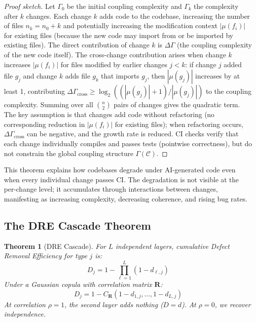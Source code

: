 \documentclass[11pt, a4paper, logo, copyright]{googledeepmind}
\newtheorem{theorem}{Theorem}[section]
\begin{document}
\begin{proof}[Proof sketch]
Let $\Gamma_0$ be the initial coupling complexity and $\Gamma_k$ the complexity after $k$ changes. Each change $k$ adds code to the codebase, increasing the number of files $n_k = n_0 + k$ and potentially increasing the modification context $|\mu(f_i)|$ for existing files (because the new code may import from or be imported by existing files). The direct contribution of change $k$ is $\Delta \Gamma$ (the coupling complexity of the new code itself). The cross-change contribution arises when change $k$ increases $|\mu(f_i)|$ for files modified by earlier changes $j < k$: if change $j$ added file $g_j$ and change $k$ adds file $g_k$ that imports $g_j$, then $|\mu(g_j)|$ increases by at least 1, contributing $\Delta \Gamma_{\text{cross}} \geq \log_2((|\mu(g_j)|+1)/|\mu(g_j)|)$ to the coupling complexity. Summing over all $\binom{n}{2}$ pairs of changes gives the quadratic term. The key assumption is that changes add code without refactoring (no corresponding reduction in $|\mu(f_i)|$ for existing files); when refactoring occurs, $\Delta \Gamma_{\text{cross}}$ can be negative, and the growth rate is reduced. CI checks verify that each change individually compiles and passes tests (pointwise correctness), but do not constrain the global coupling structure $\Gamma(\mathcal{C})$.
\end{proof}

This theorem explains how codebases degrade under AI-generated code even when every individual change passes CI. The degradation is not visible at the per-change level; it accumulates through interactions between changes, manifesting as increasing complexity, decreasing coherence, and rising bug rates.

\subsection{The DRE Cascade Theorem}

\begin{theorem}[DRE Cascade]
\label{thm:dre-cascade}
For $L$ independent layers, cumulative Defect Removal Efficiency for type $j$ is:
\begin{equation}
D_j = 1 - \prod_{\ell=1}^{L} (1 - d_{\ell,j})
\end{equation}
Under a Gaussian copula with correlation matrix $\mathbf{R}$:
\begin{equation}
D_j = 1 - C_{\mathbf{R}}(1 - d_{1,j}, \ldots, 1 - d_{L,j})
\end{equation}
At correlation $\rho = 1$, the second layer adds nothing ($D = d$). At $\rho = 0$, we recover independence.
\end{theorem}
\end{document}
